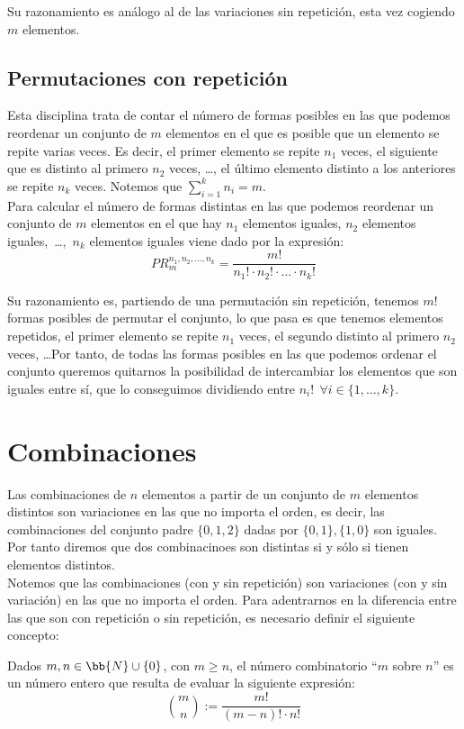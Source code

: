 Su razonamiento es análogo al de las variaciones sin repetición, esta vez cogiendo $m$ elementos.

\subsection{Permutaciones con repetición}

Esta disciplina trata de contar el número de formas posibles en las que podemos reordenar un conjunto
de $m$ elementos en el que es posible que un elemento se repite varias veces. Es decir, el primer elemento
se repite $n_1$ veces, el siguiente que es distinto al primero $n_2$ veces, \ldots, el último elemento
distinto a los anteriores se repite $n_k$ veces. Notemos que $\sum\limits_{i=1}^k n_i = m$.\\


Para calcular el número de formas distintas en las que podemos reordenar un conjunto de $m$ elementos en el
que hay $n_1$ elementos iguales, $n_2$ elementos iguales,~\ldots,~$n_k$ elementos iguales viene dado por
la expresión:
$$PR_m^{n_1, n_2, \ldots, n_k} = \dfrac{m!}{n_1! \cdot n_2! \cdot \ldots \cdot n_k!}$$


Su razonamiento es, partiendo de una permutación sin repetición, tenemos $m!$ formas posibles de permutar
el conjunto, lo que pasa es que tenemos elementos repetidos, el primer elemento se repite $n_1$ veces,
el segundo distinto al primero $n_2$ veces, \ldots Por tanto, de todas las formas posibles en las que podemos
ordenar el conjunto queremos quitarnos la posibilidad de intercambiar los elementos que son iguales entre sí,
que lo conseguimos dividiendo entre $n_i!~~\forall i \in \{1, \ldots, k\}$.

\section{Combinaciones}

Las combinaciones de $n$ elementos a partir de un conjunto de $m$ elementos distintos son variaciones
en las que no importa el orden, es decir, las combinaciones del conjunto padre $\{0, 1, 2\}$ dadas por
$\{0, 1\}, \{1, 0\}$ son iguales. Por tanto diremos que dos combinacinoes son distintas si y sólo si
tienen elementos distintos.\\

Notemos que las combinaciones (con y sin repetición) son variaciones (con y sin variación) en las que
no importa el orden. Para adentrarnos en la diferencia entre las que son con repetición o sin repetición, es necesario definir el siguiente concepto:
\begin{definicion} Dados $m,n\in \bb{N}\cup \{0\}$, con $m\geq n$, el número combinatorio ``$m$ sobre $n$'' es un número entero que resulta de evaluar la siguiente expresión:
    \begin{equation*}
        \binom{m}{n}:=\dfrac{m!}{(m-n)! \cdot n!}
    \end{equation*}
\end{definicion}

